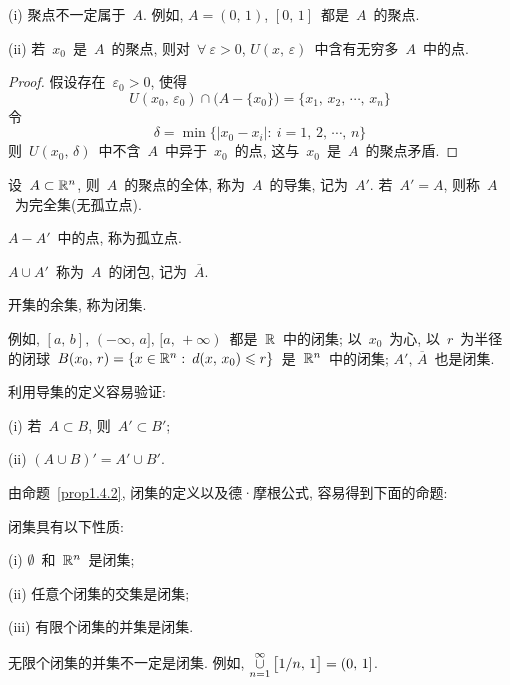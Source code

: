 \begin{remark}
(i) 聚点不一定属于~$A$. 例如, $A = (0,\,1)$, $[0,\,1]$~都是~$A$~的聚点.

(ii) 若~$x_0$~是~$A$~的聚点, 则对~$\forall~\varepsilon > 0$, $U(x,\,\varepsilon)$~中含有无穷多~$A$~中的点.

\begin{proof}
假设存在~$\varepsilon_0 > 0$, 使得
\[
U(x_0,\,\varepsilon_0) \cap \big(A - \{x_0\}\big) = \{x_1,\,x_2,\,\cdots,\,x_n\}
\]
令
\[
\delta = \min\{|x_0 - x_i|: \: i=1,\,2,\, \cdots, \, n\}
\]
则~$U(x_0,\,\delta)$~中不含~$A$~中异于~$x_0$~的点, 这与~$x_0$~是~$A$~的聚点矛盾.
\end{proof}
\end{remark}

\begin{definition}
设~$A \subset \mathbb{R}^n$, 则~$A$~的聚点的全体, 称为~$A$~的导集, 记为~$A'$. 若~$A' = A$, 则称~$A$~为完全集(无孤立点).

$A - A'$~中的点, 称为孤立点.

$A \cup A'$~称为~$A$~的闭包, 记为~$\overline{A}$.

开集的余集, 称为闭集.
\end{definition}

例如, $[a, \, b], \, (-\infty, \, a], \, [a, \, +\infty)$~都是~$\mathbb{R}$~中的闭集; 以~$x_0$~为心, 以~$r$~为半径的闭球~$B(x_0,\,r) = \{x \in \mathbb{R}^n: \: d(x,\,x_0) \leqslant r\}$~是~$\mathbb{R}^n$~中的闭集; $A',\,\overline{A}$~也是闭集.

\begin{proposition}
利用导集的定义容易验证:

(i) 若~$A \subset B$, 则~$A' \subset B'$;

(ii) $(A \cup B)' = A' \cup B'$.
\end{proposition}

由命题~\ref{prop1.4.2}, 闭集的定义以及德·摩根公式, 容易得到下面的命题:

\begin{proposition}
闭集具有以下性质:

(i) $\emptyset$~和~$\mathbb{R}^n$~是闭集;

(ii) 任意个闭集的交集是闭集;

(iii) 有限个闭集的并集是闭集.
\end{proposition}

\begin{remark}
无限个闭集的并集不一定是闭集. 例如, $\mathop{\cup}\limits_{n=1}^\infty \big[1/n,\,1\big] = (0,\,1]$.
\end{remark}

